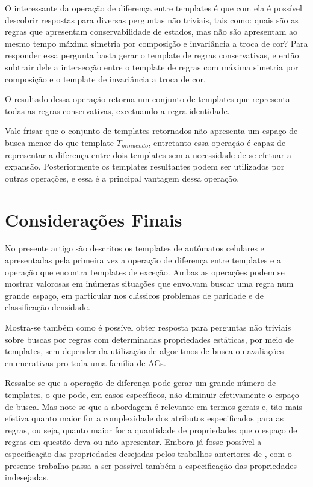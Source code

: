 \documentclass[12pt, a4paper]{article}
\begin{document}
O interessante da operação de diferença entre templates é que com ela é possível descobrir respostas para diversas perguntas não triviais, tais como: quais são as regras que apresentam conservabilidade de estados, mas não são apresentam ao mesmo tempo máxima simetria por composição e invariância a troca de cor? Para responder essa pergunta basta gerar o template de regras conservativas, e então subtrair dele a intersecção entre o template de regras com máxima simetria por composição e o template de invariância a troca de cor.

O resultado dessa operação retorna um conjunto de templates que representa todas as regras conservativas, excetuando a regra identidade.

Vale frisar que o conjunto de templates retornados não apresenta um espaço de busca menor do que template $T_{minuendo}$, entretanto essa operação é capaz de representar a diferença entre dois templates sem a necessidade de se efetuar a expansão. Posteriormente os templates resultantes podem ser utilizados por outras operações, e essa é a principal vantagem dessa operação. 









\section{Considerações Finais}
\label{sec:consideracoes_finais}
No presente artigo são descritos os templates de autômatos celulares e apresentadas pela primeira vez a operação de diferença entre templates e a operação que encontra templates de exceção. Ambas as operações podem se mostrar valorosas em inúmeras situações que envolvam buscar uma regra num grande espaço, em particular nos clássicos problemas de paridade e de classificação densidade.

Mostra-se também como é possível obter resposta para perguntas não triviais sobre buscas por regras com determinadas propriedades estáticas, por meio de templates, sem depender da utilização de algoritmos de busca ou avaliações  enumerativas pro toda uma família de ACs.

Ressalte-se que a operação de diferença pode gerar um grande número de templates, o que pode, em casos específicos, não diminuir efetivamente o espaço de busca. Mas note-se que a abordagem é relevante em termos gerais e, tão mais efetiva quanto maior for a complexidade dos atributos especificados para as regras, ou seja, quanto maior for a quantidade de propriedades que o espaço de regras em questão deva ou não apresentar. Embora já fosse possível a especificação das propriedades desejadas pelos trabalhos anteriores de \cite{deOliveira2014,deOliveira2014b}%
, com o presente trabalho passa a ser possível também a especificação das propriedades indesejadas.
\end{document}
